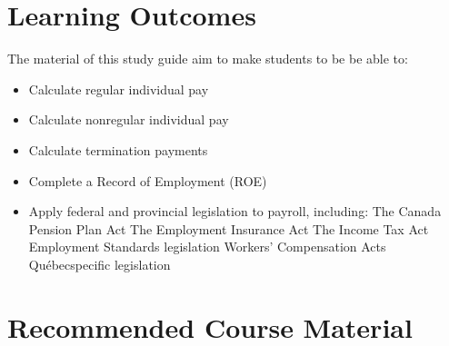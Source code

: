 \documentclass[letterpaper,10pt,english]{sphinxmanual}
\begin{document}
\section{Learning Outcomes}
\label{\detokenize{introduction:learning-outcomes}}
\sphinxAtStartPar
The material of this study guide aim to make students to be be able to:
\begin{itemize}
\item {} 
\sphinxAtStartPar
Calculate regular individual pay

\item {} 
\sphinxAtStartPar
Calculate non\sphinxhyphen{}regular individual pay

\item {} 
\sphinxAtStartPar
Calculate termination payments

\item {} 
\sphinxAtStartPar
Complete a Record of Employment (ROE)

\item {} 
\sphinxAtStartPar
Apply federal and provincial legislation to payroll, including:
\sphinxhyphen{} The Canada Pension Plan Act
\sphinxhyphen{} The Employment Insurance Act
\sphinxhyphen{} The Income Tax Act
\sphinxhyphen{} Employment Standards legislation
\sphinxhyphen{} Workers’ Compensation Acts
\sphinxhyphen{} Québec\sphinxhyphen{}specific legislation

\end{itemize}


\section{Recommended Course Material}
\label{\detokenize{introduction:recommended-course-material}}
\end{document}
